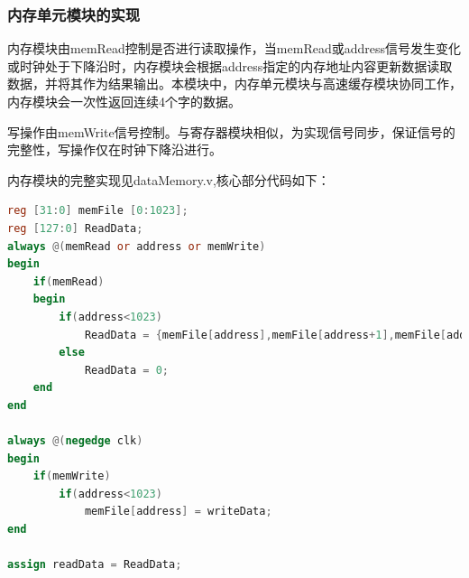 \documentclass[UTF8]{ctexart}
\begin{document}
\subsubsection{内存单元模块的实现}
内存模块由memRead控制是否进行读取操作，当memRead或address信号发生变化或时钟处于下降沿时，内存模块会根据address指定的内存地址内容更新数据读取数据，并将其作为结果输出。本模块中，内存单元模块与高速缓存模块协同工作，内存模块会一次性返回连续4个字的数据。\par
写操作由memWrite信号控制。与寄存器模块相似，为实现信号同步，保证信号的完整性，写操作仅在时钟下降沿进行。\par
内存模块的完整实现见dataMemory.v,核心部分代码如下：
\begin{lstlisting}[language=verilog]
reg [31:0] memFile [0:1023];
reg [127:0] ReadData;
always @(memRead or address or memWrite) 
begin
    if(memRead)
    begin
        if(address<1023)
            ReadData = {memFile[address],memFile[address+1],memFile[address+2],memFile[address+3]};
        else
            ReadData = 0;
    end
end

always @(negedge clk)
begin
    if(memWrite)
        if(address<1023)
            memFile[address] = writeData;
end

assign readData = ReadData;
\end{lstlisting}
\end{document}
